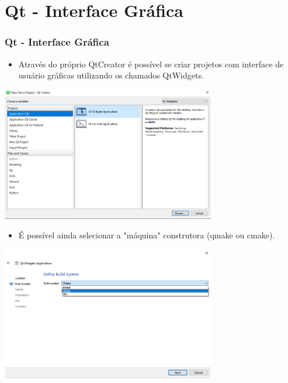\documentclass[10pt]{beamer}
\theoremstyle{remark}
\theoremstyle{definition}
\begin{document}
\section{Qt - Interface Gráfica}
\begin{frame}[allowframebreaks]
\frametitle{Qt - Interface Gráfica}

	\begin{itemize}
		\item Através do próprio QtCreator é possível se criar projetos com interface de usuário gráficas utilizando os chamados QtWidgets.
	\end{itemize}
	
	\begin{center}
		\includegraphics[width=0.7\textwidth]{images/27.png}
	\end{center}
	
	\framebreak
	
	\begin{itemize}
		\item É possível ainda selecionar a "máquina" construtora (qmake ou cmake).
	\end{itemize}
	
	\begin{center}
		\includegraphics[width=0.7\textwidth]{images/28.png}
	\end{center}
	
	\framebreak
	

\end{frame}
\end{document}
